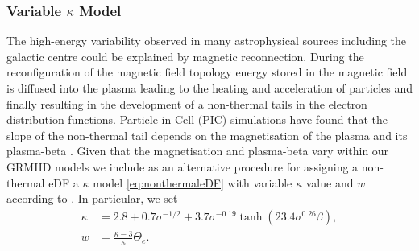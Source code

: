 
\subsubsection{Variable \texorpdfstring{$\kappa$}{kappa} Model}


The high-energy variability observed in many astrophysical sources including the galactic centre could be explained by magnetic reconnection. During the reconfiguration of the magnetic field topology energy stored in the magnetic field is diffused into the plasma leading to the heating and acceleration of particles and finally resulting in the development of a non-thermal tails in the electron distribution functions. Particle in Cell (PIC) simulations have found that the slope of the non-thermal tail depends on the magnetisation of the plasma and its plasma-beta \citep[see, e.g.,][]{2018ApJ...862...80B}. Given that the magnetisation and plasma-beta vary within our GRMHD models we include as an alternative procedure for assigning a non-thermal eDF a $\kappa$ model \eqref{eq:nonthermaleDF} with variable $\kappa$ value and $w$ according to \cite{2018ApJ...862...80B}.
In particular, we set
\begin{align}
  \kappa &= 2.8 +0.7\sigma^{-1/2} + 3.7\sigma^{-0.19}\tanh{(23.4\sigma^{0.26}\beta)}, \label{eq:kappa}\\
  w      &= \frac{ \kappa -3 }{\kappa} \Theta_e.
\end{align}

